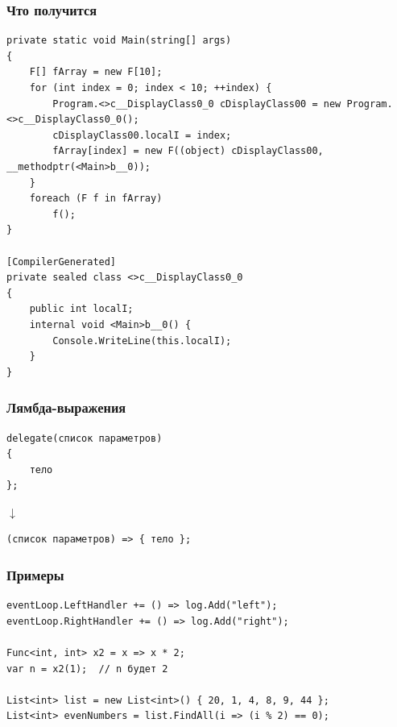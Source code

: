 \documentclass[xetex,mathserif,serif]{beamer}
\begin{document}
    \begin{frame}[fragile]
        \frametitle{Что получится}
        \begin{scriptsize}
            \begin{verbatim}
private static void Main(string[] args)
{
    F[] fArray = new F[10];
    for (int index = 0; index < 10; ++index) {
        Program.<>c__DisplayClass0_0 cDisplayClass00 = new Program.<>c__DisplayClass0_0();
        cDisplayClass00.localI = index;
        fArray[index] = new F((object) cDisplayClass00, __methodptr(<Main>b__0));
    }
    foreach (F f in fArray)
        f();
}

[CompilerGenerated]
private sealed class <>c__DisplayClass0_0
{
    public int localI;
    internal void <Main>b__0() {
        Console.WriteLine(this.localI);
    }
}
            \end{verbatim}
        \end{scriptsize}
    \end{frame}

    \begin{frame}[fragile]
        \frametitle{Лямбда-выражения}
        \begin{verbatim}
delegate(список параметров)
{
    тело
};
        \end{verbatim}
        \hspace{2cm}\begin{LARGE}$\downarrow$\end{LARGE}
        \begin{verbatim}
(список параметров) => { тело };
        \end{verbatim}
    \end{frame}

    \begin{frame}[fragile]
        \frametitle{Примеры}
        \begin{verbatim}
eventLoop.LeftHandler += () => log.Add("left");
eventLoop.RightHandler += () => log.Add("right");

Func<int, int> x2 = x => x * 2;
var n = x2(1);  // n будет 2

List<int> list = new List<int>() { 20, 1, 4, 8, 9, 44 };
List<int> evenNumbers = list.FindAll(i => (i % 2) == 0);
        \end{verbatim}
    \end{frame}
\end{document}
